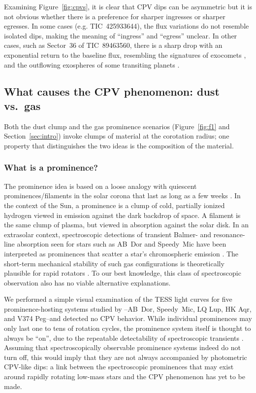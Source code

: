 \documentclass[11pt,twocolumn,tighten]{aastex63}
\begin{document}
Examining Figure~\ref{fig:cpvs}, it is clear that CPV dips can be
asymmetric but it is not obvious whether there is a preference for
sharper ingresses or sharper egresses.  In some cases (e.g.
TIC~425933644), the flux variations do not resemble isolated dips,
making the meaning of ``ingress'' and ``egress'' unclear.  In other
cases, such as Sector~36 of TIC~89463560, there is a sharp drop with
an exponential return to the baseline flux, resembling the signatures
of exocomets \citep[e.g.][]{2018MNRAS.474.1453R,2019A&A...625L..13Z},
and the outflowing exospheres of some transiting planets
\citep[e.g.][]{2019ApJ...873...89M,2022ApJ...926..226M}.


\subsection{What causes the CPV phenomenon: dust vs.\ gas}

Both the dust clump and the gas prominence scenarios
(Figure~\ref{fig:f1} and Section~\ref{sec:intro}) invoke clumps of
material at the corotation radius; one property that distinguishes the
two ideas is the composition of the material.

\subsubsection{What is a prominence?}
The prominence idea is based on a loose analogy with quiescent
prominences/filaments in the solar corona that last as long as a few
weeks \citep[see][]{2015ASSL..415.....V}.  In the context of the Sun,
a prominence is a clump of cold, partially ionized hydrogen viewed in
emission against the dark backdrop of space.  A filament is the same
clump of plasma, but viewed in absorption against the solar disk.  In
an extrasolar context, spectroscopic detections of transient Balmer-
and resonance-line absorption seen for stars such as AB~Dor and
Speedy~Mic
\citep[e.g.][]{1989MNRAS.238..657C,1993MNRAS.262..369J,2006MNRAS.365..530D,2016MNRAS.463..965L}
have been interpreted as prominences that scatter a star's
chromospheric emission \citep[see][]{1989MNRAS.238..657C}.  The
short-term mechanical stability of such gas configurations is
theoretically plausible for rapid rotators
\citep{2000MNRAS.316..647F,2022MNRAS.514.5465W}.   To our best
knowledge, this class of spectroscopic observation also has no viable
alternative explanations.

We performed a simple visual examination of the TESS light curves for
five prominence-hosting systems studied by
\citet{2019MNRAS.482.2853J}--AB~Dor, Speedy~Mic, LQ Lup, HK Aqr, and
V374 Peg--and detected no CPV behavior.  While individual prominences
may only last one to tens of rotation cycles, the prominence system
itself is thought to always be ``on'', due to the repeatable
detectability of spectroscopic transients \citep[e.g.][and references
therein]{1990MNRAS.247..415C}.  Assuming that spectroscopically
observable prominence systems indeed do not turn off, this would imply
that they are not always accompanied by photometric CPV-like dips: a
link between the spectroscopic prominences that may exist around
rapidly rotating low-mass stars and the CPV phenomenon has yet to be
made.  
\end{document}
